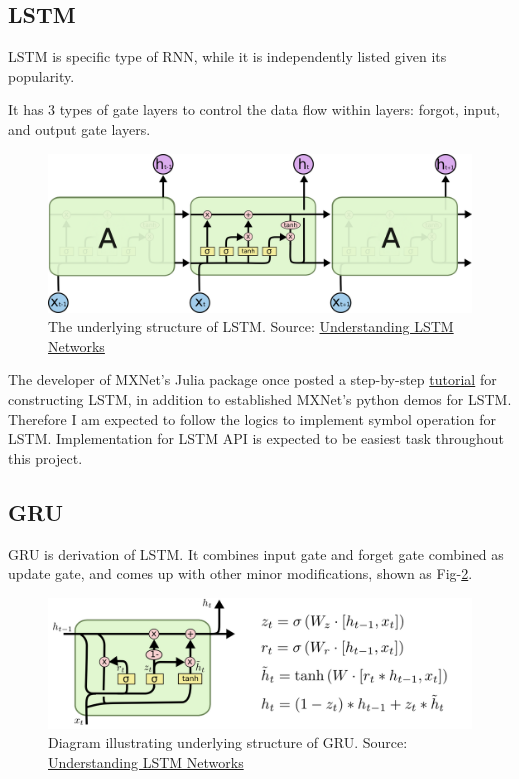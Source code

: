 \documentclass[]{article}
\begin{document}
\subsection{LSTM}\label{lstm}

LSTM is specific type of RNN, while it is independently listed given its
popularity.

It has 3 types of gate layers to control the data flow within layers:
forgot, input, and output gate layers.

\begin{figure}[ht]
\centering
\includegraphics[width=0.7\linewidth]{LSTM3-chain.png}
\caption{The underlying structure of LSTM. Source: \href{http://colah.github.io/posts/2015-08-Understanding-LSTMs/}{Understanding LSTM Networks}}
\label{fig:lstm-3-chain}
\end{figure}


The developer of MXNet's Julia package once posted a step-by-step
\href{http://mxnetjl.readthedocs.org/en/latest/tutorial/char-lstm.html}{tutorial}
for constructing LSTM, in addition to established MXNet's python demos
for LSTM. Therefore I am expected to follow the logics to implement
symbol operation for LSTM. Implementation for LSTM API is expected to be
easiest task throughout this project.

\subsection{GRU}\label{gru}

GRU is derivation of LSTM. It combines input gate and forget gate
combined as update gate, and comes up with other minor modifications, shown as Fig-\ref{fig:gru}.

\begin{figure}[ht]
\centering
\includegraphics[width=0.7\linewidth]{LSTM3-var-GRU.png}
\caption{Diagram illustrating underlying structure of GRU. Source: \href{http://colah.github.io/posts/2015-08-Understanding-LSTMs/}{Understanding LSTM Networks}}
\label{fig:gru}
\end{figure}
\end{document}
